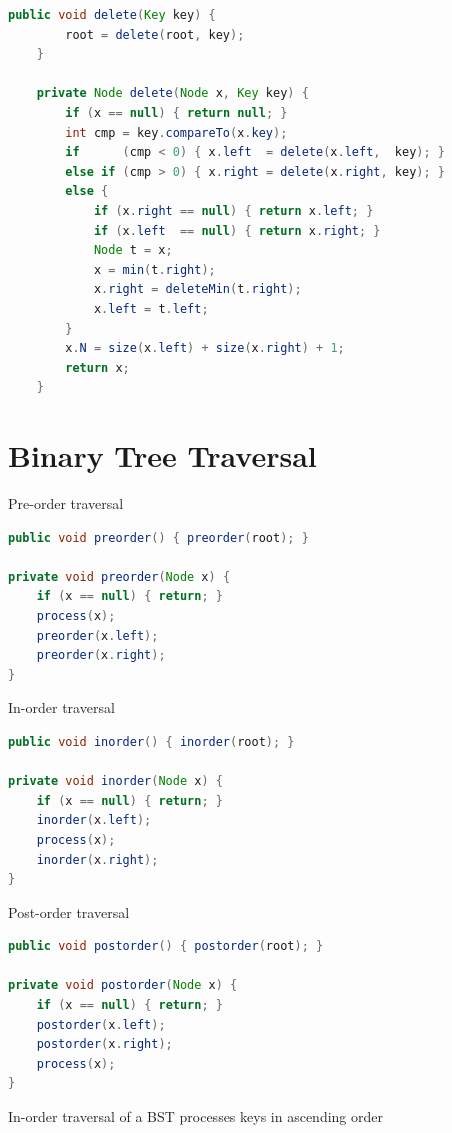 \documentclass[8pt,a4paper,compress]{beamer}
\begin{document}
\begin{frame}[fragile]
\pause

\begin{lstlisting}[language=Java]
    public void delete(Key key) {
        root = delete(root, key);
    }

    private Node delete(Node x, Key key) {
        if (x == null) { return null; }
        int cmp = key.compareTo(x.key);
        if      (cmp < 0) { x.left  = delete(x.left,  key); }
        else if (cmp > 0) { x.right = delete(x.right, key); }
        else { 
            if (x.right == null) { return x.left; }
            if (x.left  == null) { return x.right; }
            Node t = x;
            x = min(t.right);
            x.right = deleteMin(t.right);
            x.left = t.left;
        } 
        x.N = size(x.left) + size(x.right) + 1;
        return x;
    } 
\end{lstlisting}
\end{frame}

\section{Binary Tree Traversal}
\begin{frame}[fragile]
\pause

Pre-order traversal
\begin{lstlisting}[language=Java]
public void preorder() { preorder(root); }

private void preorder(Node x) {
    if (x == null) { return; }
    process(x);
    preorder(x.left);
    preorder(x.right);
}
\end{lstlisting}

\pause
\bigskip

In-order traversal
\begin{lstlisting}[language=Java]
public void inorder() { inorder(root); }

private void inorder(Node x) {
    if (x == null) { return; }
    inorder(x.left);
    process(x);
    inorder(x.right);
}
\end{lstlisting}

\pause
\bigskip

Post-order traversal
\begin{lstlisting}[language=Java]
public void postorder() { postorder(root); }

private void postorder(Node x) {
    if (x == null) { return; }
    postorder(x.left);
    postorder(x.right);
    process(x);
}
\end{lstlisting}

\pause
\bigskip

In-order traversal of a BST processes keys in ascending order
\end{frame}
\end{document}
